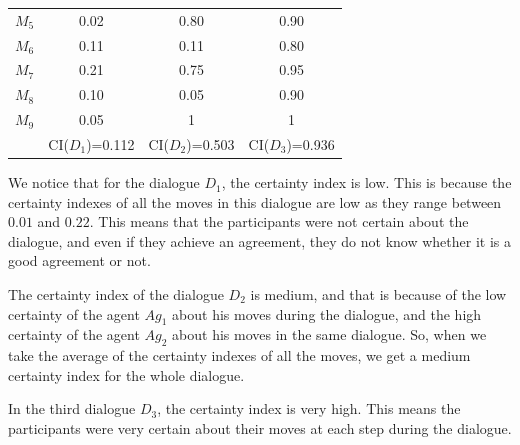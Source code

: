 \begin{example}
\begin{table}[tbp]
\begin{tabular}{cccc}
   {$M_5$} & {0.02} & {0.80} & {0.90} \\
   {$M_6$} & {0.11} & {0.11} & {0.80} \\
   {$M_7$} & {0.21} & {0.75} & {0.95} \\
   {$M_8$} & {0.10} & {0.05} & {0.90} \\
   {$M_9$} & {0.05} & {1}    & {1} \\
\hline
   & {CI($D_1$)=0.112} & {CI($D_2$)=0.503}    & {CI($D_3$)=0.936} \\
\hline
\end{tabular}
\end{table}
%
We notice that for the dialogue $D_1$, the certainty index is low. This is because the certainty indexes of all the moves in this
dialogue are low as they range between $0.01$ and $0.22$. This means that the participants were not certain about the dialogue,
and even if they achieve an agreement, they do not know whether it is a good agreement or not.



The certainty index of the dialogue $D_2$ is medium, and that is because of the low certainty of the agent \emph{$Ag_1$} about his
moves during the dialogue, and the high certainty of the agent $Ag_2$ about his moves in the same dialogue. So, when we take the
average of the certainty indexes of all the moves, we get a medium certainty index for the whole dialogue.


In the third dialogue $D_3$, the certainty index is very high. This means the participants were very certain about their moves at
each step during the dialogue. %
\end{example}

